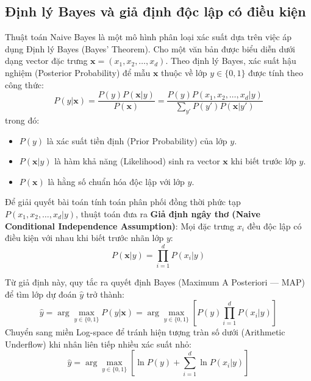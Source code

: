\subsection{Định lý Bayes và giả định độc lập có điều kiện}
Thuật toán Naive Bayes là một mô hình phân loại xác suất dựa trên việc áp dụng Định lý Bayes (Bayes' Theorem). Cho một văn bản được biểu diễn dưới dạng vector đặc trưng $\mathbf{x} = (x_1, x_2, \dots, x_d)$. Theo định lý Bayes, xác suất hậu nghiệm (Posterior Probability) để mẫu $\mathbf{x}$ thuộc về lớp $y \in \{0, 1\}$ được tính theo công thức:
\begin{equation}
P(y | \mathbf{x}) = \frac{P(y) P(\mathbf{x} | y)}{P(\mathbf{x})} = \frac{P(y) P(x_1, x_2, \dots, x_d | y)}{\sum_{y'} P(y') P(\mathbf{x} | y')}
\end{equation}
trong đó:
\begin{itemize}
    \item $P(y)$ là xác suất tiền định (Prior Probability) của lớp $y$.
    \item $P(\mathbf{x} | y)$ là hàm khả năng (Likelihood) sinh ra vector $\mathbf{x}$ khi biết trước lớp $y$.
    \item $P(\mathbf{x})$ là hằng số chuẩn hóa độc lập với lớp $y$.
\end{itemize}

Để giải quyết bài toán tính toán phân phối đồng thời phức tạp $P(x_1, x_2, \dots, x_d | y)$, thuật toán đưa ra \textbf{Giả định ngây thơ (Naive Conditional Independence Assumption)}: Mọi đặc trưng $x_i$ đều độc lập có điều kiện với nhau khi biết trước nhãn lớp $y$:
\begin{equation}
P(\mathbf{x} | y) = \prod_{i=1}^d P(x_i | y)
\end{equation}

Từ giả định này, quy tắc ra quyết định Bayes (Maximum A Posteriori --- MAP) để tìm lớp dự đoán $\hat{y}$ trở thành:
\begin{equation}
\hat{y} = \arg\max_{y \in \{0, 1\}} P(y | \mathbf{x}) = \arg\max_{y \in \{0, 1\}} \left[ P(y) \prod_{i=1}^d P(x_i | y) \right]
\end{equation}
Chuyển sang miền Log-space để tránh hiện tượng tràn số dưới (Arithmetic Underflow) khi nhân liên tiếp nhiều xác suất nhỏ:
\begin{equation}
\hat{y} = \arg\max_{y \in \{0, 1\}} \left[ \ln P(y) + \sum_{i=1}^d \ln P(x_i | y) \right]
\end{equation}

